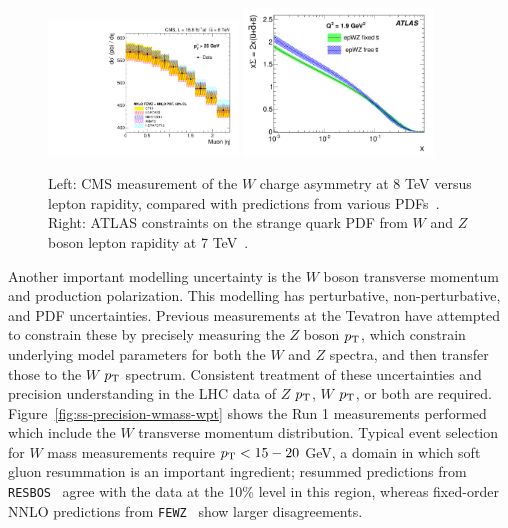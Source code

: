 \begin{figure}[p]
    \centering
    \includegraphics[width=0.45\textwidth]{figures/ss-precision-wmass-wasymmetry.pdf}
    \includegraphics[width=0.45\textwidth]{figures/ss-precision-wmass-wzratio.pdf}
    \caption{
    Left: CMS measurement of the $W$ charge asymmetry at 8 TeV versus lepton
    rapidity, compared with predictions from various PDFs~\cite{Khachatryan:2016pev}.
    Right:  ATLAS constraints on the strange quark PDF from $W$ and $Z$ boson lepton rapidity at 7 TeV~\cite{Aad:2012sb}.}
    \label{fig:ss-precision-wmass-pdf}
\end{figure}

Another important modelling uncertainty is the $W$ boson transverse
momentum and production polarization.  This modelling has
perturbative, non-perturbative, and PDF uncertainties. Previous
measurements at the Tevatron have attempted to constrain these by
precisely measuring the $Z$ boson $p_{\mathrm{T}}$, which constrain underlying
model parameters for both the $W$ and $Z$ spectra, and then transfer
those to the $W$ $p_{\mathrm{T}}$ spectrum.  Consistent treatment of these
uncertainties and precision understanding in the LHC data of $Z$
$p_{\mathrm{T}}$, $W$ $p_{\mathrm{T}}$, or both are required.
Figure~\ref{fig:ss-precision-wmass-wpt} shows the Run 1 measurements
performed which include the $W$ transverse momentum distribution.
Typical event selection for $W$ mass measurements require $p_{\mathrm{T}} <
15-20$ GeV, a domain in which soft gluon resummation is an important
ingredient; resummed predictions from \texttt{RESBOS}~\cite{Ladinsky:1993zn,Landry:2002ix,Guzzi:2013aja}
agree with the data at the 10\% level in this region, whereas
fixed-order NNLO predictions from
\texttt{FEWZ}~\cite{Melnikov:2006kv,Gavin:2010az,Gavin:2012sy,Li:2012wna} show larger
disagreements.


